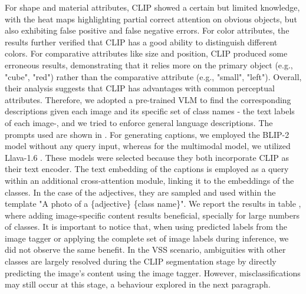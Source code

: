 For shape and material attributes, CLIP showed a certain but limited knowledge, with the heat maps highlighting partial correct attention on obvious objects, but also exhibiting false positive and false negative errors. For color attributes, the results further verified that CLIP has a good ability to distinguish different colors.
For comparative attributes like size and position, CLIP produced some erroneous results, demonstrating that it relies more on the primary object (e.g., "cube", "red") rather than the comparative attribute (e.g., "small", "left"). Overall, their analysis suggests that CLIP has advantages with common perceptual attributes.
Therefore, we adopted a pre-trained VLM to find the corresponding descriptions given each image and its specific set of class names - the text labels of each image-, and we tried to enforce general language descriptions.
The prompts used are shown in . For generating captions, we employed the BLIP-2 model \cite{li2023blip} without any query input, whereas for the multimodal model, we utilized Llava-1.6 \cite{liu2024llavanext}. These models were selected because they both incorporate CLIP as their text encoder.
The text embedding of the captions is employed as a query within an additional cross-attention module, linking it to the embeddings of the classes. In the case of the adjectives, they are sampled and used within the template "A photo of a \{adjective\} \{class name\}".
We report the results in table , where adding image-specific content results beneficial, specially for large numbers of classes.
It is important to notice that, when using predicted labels from the image tagger or applying the complete set of image labels during inference, we did not observe the same benefit. %
In the VSS scenario, ambiguities with other classes are largely resolved during the CLIP segmentation stage by directly predicting the image's content using the image tagger. However, misclassifications may still occur at this stage, a behaviour explored in the next paragraph.

